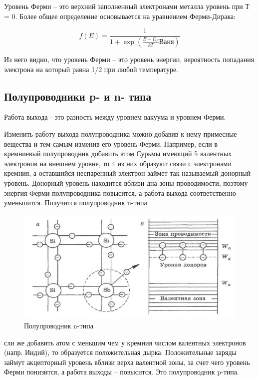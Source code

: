 \documentclass[a4paper,12pt]{article}
\begin{document}
Уровень Ферми – это верхний заполненный электронами металла уровень при Т = 0. Более общее определение основывается на уравнением Ферми-Дирака:

\begin{equation}
f(E) = \frac{1}{1 + \exp(\frac{E-E_F}{kT} Ваня)}
\end{equation}

Из него видно, что уровень Ферми – это уровень энергии, вероятность попадания электрона на который равна 1/2 при любой температуре.

\subsection{Полупроводники p- и n- типа}

Работа выхода - это разность между уровнем вакуума и уровнем Ферми. 

Изменить работу выхода полупроводника можно добавив к нему примесные вещества и тем самым изменив его уровень Ферми. Например, если в кремниевый полупроводник добавить атом Сурьмы имеющий 5 валентных электронов на внешнем уровне, то 4 из них образуют связи с электронами кремния, а оставшийся неспаренный электрон займет так называемый донорный уровень. Донорный уровень находится вблизи дна зоны проводимости, поэтому энергия Ферми полупроводника повысится, а работа выхода соответственно уменьшится. Получится полупроводник n-типа 

\begin{figure}[h!]
	\begin{center}
	\includegraphics[scale = 0.6]{fig7}
	\caption{Полупроводник n-типа}
	\end{center}
\end{figure}

сли же добавить атом с меньшим чем у кремния числом валентных электронов (напр. Индий), то образуется положительная дырка. Положительные заряды займут акцепторный уровень вблизи верха валентной зоны, за счет чего уровень Ферми понизится, а работа выходы – повысится. Это полупроводник p-типа.
\end{document}
